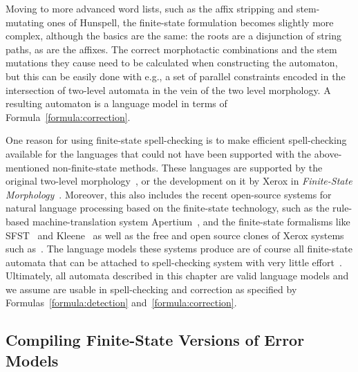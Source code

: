 \documentclass[a4paper,12pt]{article}
\begin{document}
Moving to more advanced word lists, such as the affix stripping and stem-mutating 
ones of Hunspell, the finite-state formulation becomes slightly more
complex, although the basics are the same: the roots are a disjunction of string
paths, as are the affixes. The correct morphotactic combinations and the
stem mutations they cause need to be calculated when constructing the
automaton, but this can be easily done with e.g., a set of parallel constraints
encoded in the intersection of two-level automata \cite[]{pirinen2010creating}
in the vein of the two level morphology. A resulting automaton is a language
model in terms of Formula~\ref{formula:correction}.

One reason for using finite-state spell-checking is to make efficient
spell-checking available for the languages that could not have been supported
with the above-mentioned non-finite-state methods. These languages are
supported by the original two-level morphology~\cite[]{koskenniemi/1983}, or the
development on it by Xerox in \emph{Finite-State
Morphology}~\cite[]{beesley2003finite}. Moreover, this also includes the
recent open-source systems for natural language processing based on the
finite-state technology, such as the rule-based machine-translation system
Apertium~\cite[]{apertium2010}, and the finite-state formalisms like
SFST~\cite[]{schmid2006programming} and Kleene~\cite[]{beesley2012kleene} as
well as the free and open source clones of Xerox systems
such as~\cite{hfst/2012/cla,hulden2009foma}. The language models these systems
produce are of course all finite-state automata that can be attached to
spell-checking system with very little
effort~\cite[e.g.][]{pirinen2012compiling}. Ultimately, all automata described
in this chapter are valid language models and we assume are usable in
spell-checking and correction as specified by Formulas~\ref{formula:detection}
and~\ref{formula:correction}.

\subsection{Compiling Finite-State Versions of Error Models}
\label{subsec:error-models}
\end{document}

